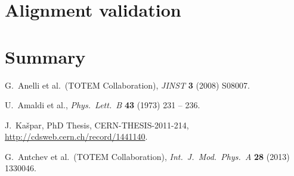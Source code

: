 \documentclass[TOTEM]{cern/cernphprep}
\def\etal{et al.}
\def\Name#1{#1, }
\def\Review#1#2#3#4{{\it #1} {\bf #2} (#3) #4}
\begin{document}

\section{Alignment validation}
\label{s:val}


\section{Summary}
\label{s:sum}


\begin{thebibliography}{99}

	\Name{G.~Anelli \etal{}~(TOTEM Collaboration)}
	\Review{JINST}{3}{2008}{S08007}.

	\Name{U.~Amaldi et al.}
	\Review{Phys.~Lett.~B}{43}{1973}{231 -- 236}.

	\Name{J.~Ka\v spar}
	PhD Thesis, CERN-THESIS-2011-214,
	\url{http://cdsweb.cern.ch/record/1441140}.

	\Name{G.~Antchev \etal{}~(TOTEM Collaboration)}
	\Review{Int.~J.~Mod.~Phys.~A}{28}{2013}{1330046}.

\end{thebibliography}
\end{document}
